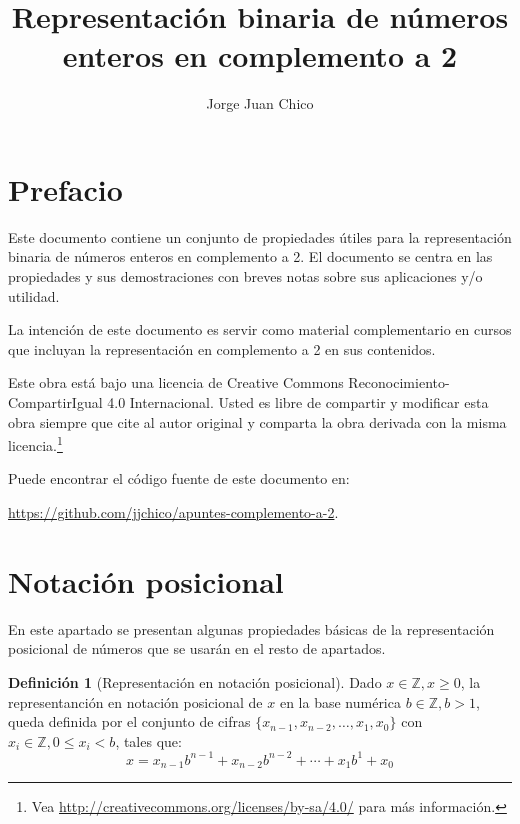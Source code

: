 \documentclass[spanish,a4paper,12pt,titlepage]{article}
\title{Representación binaria de números enteros en complemento a 2}
\author{Jorge Juan Chico}
\affil{\textit{jjchico@dte.us.es}}
\affil{Departamento de Tecnología Electrónica.\\Universidad de Sevilla}
\theoremstyle{definition}
\newtheorem{definition}{Definición}%
\theoremstyle{remark}
\newcommand{\bbZ}{\mathbb{Z}}
\begin{document}
\maketitle
\newpage
\tableofcontents
\newpage

\section*{Prefacio}

Este documento contiene un conjunto de propiedades útiles para la representación binaria de números enteros en complemento a 2. El documento se centra en las propiedades y sus demostraciones con breves notas sobre sus aplicaciones y/o utilidad.

La intención de este documento es servir como material complementario en cursos que incluyan la representación en complemento a 2 en sus contenidos.

Este obra está bajo una licencia de Creative Commons Reconocimiento-CompartirIgual 4.0 Internacional. Usted es libre de compartir y modificar esta obra siempre que cite al autor original y comparta la obra derivada con la misma licencia.\footnote{
Vea \url{http://creativecommons.org/licenses/by-sa/4.0/} para más información.
}

Puede encontrar el código fuente de este documento en:

\url{https://github.com/jjchico/apuntes-complemento-a-2}.

\section{Notación posicional}

En este apartado se presentan algunas propiedades básicas de la representación posicional de números que se usarán en el resto de apartados.

\begin{definition}[Representación en notación posicional]
 Dado $x \in \bbZ, x \ge 0$, la representanción en notación posicional
 de $x$ en la base numérica $b \in \bbZ, b > 1$, queda definida por el
 conjunto de cifras $\{x_{n-1}, x_{n-2}, \ldots, x_1, x_0\}$ con $x_i \in
 \bbZ, 0 \le x_i < b$, tales que:
  \[
    x = x_{n-1} b^{n-1}+x_{n-2} b^{n-2}+ \cdots + x_1 b^1+x_0
  \]
\end{definition}
\end{document}
